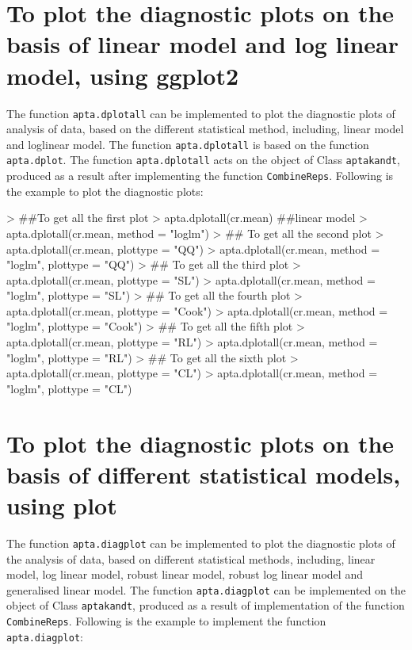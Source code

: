 \documentclass[11pt]{article}
\newcommand{\code}[1]{{\tt #1}}
\begin{document}
\section{To plot the diagnostic plots on the basis of linear model and log linear model, using ggplot2}
The function \code{apta.dplotall} can be implemented to plot the diagnostic plots of analysis of
data, based on the different statistical method, including, linear model and loglinear model. The
function \code{apta.dplotall} is based on the function \code{apta.dplot}. The function \code{apta.dplotall} acts on the object of Class \code{aptakandt}, produced as a result after implementing the function \code{CombineReps}. Following is the example to plot the diagnostic plots:

\begin{Schunk}
\begin{Sinput}
> ##To get all the first plot
> apta.dplotall(cr.mean)  ##linear model
> apta.dplotall(cr.mean, method = "loglm")
> ## To get all the second plot
> apta.dplotall(cr.mean, plottype = "QQ")
> apta.dplotall(cr.mean, method = "loglm", plottype = "QQ")
> ## To get all the third plot
> apta.dplotall(cr.mean, plottype = "SL")
> apta.dplotall(cr.mean, method = "loglm", plottype = "SL")
> ## To get all the fourth plot
> apta.dplotall(cr.mean, plottype = "Cook")
> apta.dplotall(cr.mean, method = "loglm", plottype = "Cook")
> ## To get all the fifth plot
> apta.dplotall(cr.mean, plottype = "RL")
> apta.dplotall(cr.mean, method = "loglm", plottype = "RL")
> ## To get all the sixth plot
> apta.dplotall(cr.mean, plottype = "CL")
> apta.dplotall(cr.mean, method = "loglm", plottype = "CL")
\end{Sinput}
\end{Schunk}


\section{To plot the diagnostic plots on the basis of different statistical models, using plot}
The function \code{apta.diagplot} can be implemented to plot the diagnostic plots of the analysis of data, based on different statistical methods, including, linear model, log linear model, robust linear model, robust log linear model and generalised linear model. The function \code{apta.diagplot} can be implemented on the object of Class \code{aptakandt}, produced as a result of implementation of the function \code{CombineReps}. Following is the example to implement the function \code{apta.diagplot}:
\end{document}
